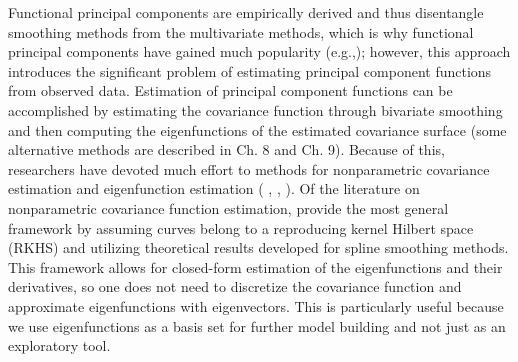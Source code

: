 Functional principal components are empirically derived and thus disentangle smoothing methods from the multivariate methods, which is why functional principal components have gained much popularity (e.g.,\cite{Yao:2005cv,Di:2009dz,Gromenko:2012ij}); however, this approach introduces the significant problem of estimating principal component functions from observed data. Estimation of principal component functions can be accomplished by estimating the covariance function through bivariate smoothing and then computing the eigenfunctions of the estimated covariance surface (some alternative methods are described in \cite{FDA} Ch. 8 and Ch. 9). Because of this, researchers have devoted much effort to methods for nonparametric covariance estimation and eigenfunction estimation ( \cite{Yao:2005cv}, \cite{Li:2007dn}, \cite{Cai:2010vr}).  Of the literature on nonparametric covariance function estimation, \cite{Cai:2010vr} provide the most general framework by assuming curves belong to a reproducing kernel Hilbert space (RKHS) and utilizing theoretical results developed for spline smoothing methods. This framework allows for closed-form estimation of the eigenfunctions and their derivatives, so one does not need to discretize the covariance function and approximate eigenfunctions with eigenvectors.  This is particularly useful because we use eigenfunctions as a basis set for further model building and not just as an exploratory tool. 

